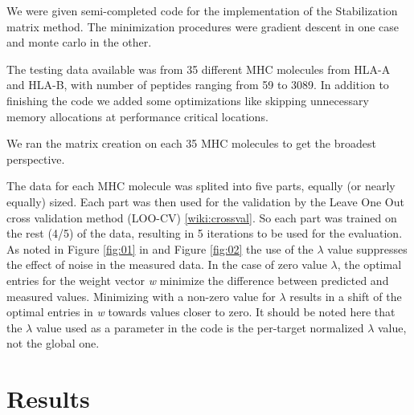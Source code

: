 \documentclass{bioinfo}
\begin{document}
\begin{application}
We were given semi-completed code for the implementation of the Stabilization matrix method. The minimization procedures were gradient descent in one case and monte carlo in the other. 
\par The testing data available was from 35 different MHC molecules from HLA-A and HLA-B, with number of peptides ranging from 59 to 3089. In addition to finishing the code we added some optimizations like skipping unnecessary memory allocations at performance critical locations. 
\par We ran the matrix creation on each 35 MHC molecules to get the broadest perspective.
\par The data for each MHC molecule was splited into five parts, equally (or nearly equally) sized. Each part was then used for the validation by the Leave One Out cross validation method (LOO-CV) \ref{wiki:crossval}. So each part was trained on the rest (4/5) of the data, resulting in 5 iterations to be used for the evaluation.
As noted in Figure \ref{fig:01} in and Figure \ref{fig:02} the use of the $\lambda$ value suppresses the effect of noise in the measured data. In the case of zero value $\lambda$, the optimal entries for the weight vector \textit{w} minimize the difference between predicted and measured values.  Minimizing with a non-zero value for $\lambda$ results in a shift of the optimal entries in \textit{w} towards values closer to zero. It should be noted here that the $\lambda$ value used as a parameter in the code is the per-target normalized $\lambda$ value, not the global one.


\section*{Results}



\end{application}
\end{document}
